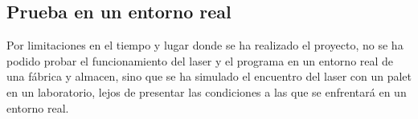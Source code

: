 \subsection{Prueba en un entorno real}
Por limitaciones en el tiempo y lugar donde se ha realizado el proyecto, no se ha podido probar el funcionamiento del laser y el programa en un entorno real de una fábrica y almacen, sino que se ha simulado el encuentro del laser con un palet en un laboratorio, lejos de presentar las condiciones a las que se enfrentará en un entorno real.





